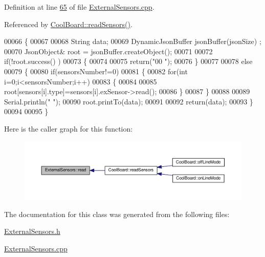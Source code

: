 Definition at line \hyperlink{_external_sensors_8cpp_source_l00065}{65} of file \hyperlink{_external_sensors_8cpp_source}{External\+Sensors.\+cpp}.



Referenced by \hyperlink{_cool_board_8cpp_source_l00509}{Cool\+Board\+::read\+Sensors()}.


\begin{DoxyCode}
00066 \{
00067 
00068     String data;
00069     DynamicJsonBuffer  jsonBuffer(jsonSize) ;
00070     JsonObject& root = jsonBuffer.createObject();
00071 
00072     \textcolor{keywordflow}{if}(!root.success() )
00073     \{
00074 
00075      \textcolor{keywordflow}{return}(\textcolor{stringliteral}{"00 "});
00076     \}
00077 
00078     \textcolor{keywordflow}{else}
00079     \{
00080         \textcolor{keywordflow}{if}(sensorsNumber!=0)
00081         \{
00082             \textcolor{keywordflow}{for}(\textcolor{keywordtype}{int} i=0;i<sensorsNumber;i++)
00083             \{
00084             
00085                 root[sensors[i].type]=sensors[i].exSensor->read();      
00086             \}
00087         \}   
00088         
00089         Serial.println(\textcolor{stringliteral}{" "});
00090         root.printTo(data);
00091     
00092         \textcolor{keywordflow}{return}(data);
00093     \}
00094 
00095 \}
\end{DoxyCode}
Here is the caller graph for this function\+:
\nopagebreak
\begin{figure}[H]
\begin{center}
\leavevmode
\includegraphics[width=350pt]{class_external_sensors_a53177b81eca3be89508b5511ddcd00fc_icgraph}
\end{center}
\end{figure}


The documentation for this class was generated from the following files\+:\begin{DoxyCompactItemize}
\item 
\hyperlink{_external_sensors_8h}{External\+Sensors.\+h}\item 
\hyperlink{_external_sensors_8cpp}{External\+Sensors.\+cpp}\end{DoxyCompactItemize}

